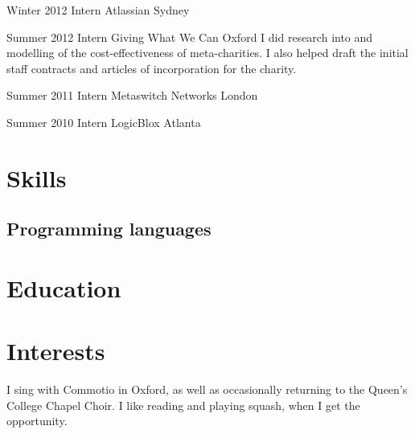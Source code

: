 \documentclass[12pt,a4paper,sans]{moderncv}
\begin{document}
\cventry
{Winter 2012}
{Intern}
{Atlassian}
{Sydney}
{}
{}

\cventry
{Summer 2012}
{Intern}
{Giving What We Can}
{Oxford}
{}
{
  I did research into and modelling of the cost-effectiveness of meta-charities.
  I also helped draft the initial staff contracts and articles of incorporation for the charity.
}

\cventry
{Summer 2011}
{Intern}
{Metaswitch Networks}
{London}
{}
{}

\cventry
{Summer 2010}
{Intern}
{LogicBlox}
{Atlanta}
{}
{}

\section{Skills}

\subsection{Programming languages}


\section{Education}

\printbibliography[title={Publications}]


\section{Interests}
I sing with Commotio in Oxford, as well as occasionally returning to the Queen's College Chapel Choir. I like reading and playing squash, when I get the opportunity.
\end{document}
